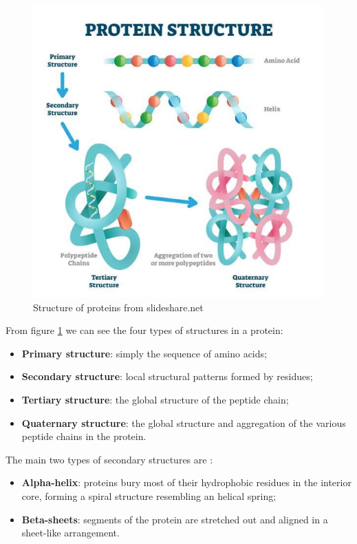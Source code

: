 \begin{figure}[h!]
	\includegraphics[scale=0.75]{res/proteins_overview/protein_structure.png}
	\centering
	\caption{Structure of proteins from slideshare.net \cite{structureproteins}}
	\label{fig:protein-structure}
\end{figure}

From figure \ref{fig:protein-structure} we can see the four types of structures in a protein:

\begin{itemize}
	\item \textbf{Primary structure}: simply the sequence of amino acids;
	\item \textbf{Secondary structure}: local structural patterns formed by residues;
	\item \textbf{Tertiary structure}: the global structure of the peptide chain;
	\item \textbf{Quaternary structure}: the global structure and aggregation of the various peptide chains in the protein. 
\end{itemize}

\vspace{2em}

The main two types of secondary structures are :

\begin{itemize}
	\item \textbf{Alpha-helix}: proteins bury most of their hydrophobic residues in the interior core, forming a spiral structure resembling an helical spring;
	\item \textbf{Beta-sheets}: segments of the protein are stretched out and aligned in a sheet-like arrangement.
\end{itemize}
\vspace{6em}
\pagebreak
